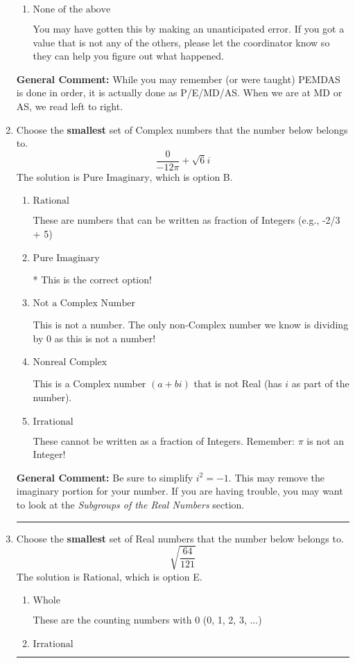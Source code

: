 \documentclass{extbook}[14pt]
\newcommand{\litem}[1]{\item #1

\rule{\textwidth}{0.4pt}}
\begin{document}
\begin{enumerate}
{\begin{enumerate}[label=\Alph*.]
 215.727, which corresponds to an Order of Operations error: multiplying by negative before squaring. For example: $(-3)^2 \neq -3^2$
\item \( \text{None of the above} \)

 You may have gotten this by making an unanticipated error. If you got a value that is not any of the others, please let the coordinator know so they can help you figure out what happened.
\end{enumerate}

\textbf{General Comment:} While you may remember (or were taught) PEMDAS is done in order, it is actually done as P/E/MD/AS. When we are at MD or AS, we read left to right.
}
\litem{
Choose the \textbf{smallest} set of Complex numbers that the number below belongs to.
\[ \frac{0}{-12 \pi}+\sqrt{6}i \]The solution is \( \text{Pure Imaginary} \), which is option B.\begin{enumerate}[label=\Alph*.]
\item \( \text{Rational} \)

These are numbers that can be written as fraction of Integers (e.g., -2/3 + 5)
\item \( \text{Pure Imaginary} \)

* This is the correct option!
\item \( \text{Not a Complex Number} \)

This is not a number. The only non-Complex number we know is dividing by 0 as this is not a number!
\item \( \text{Nonreal Complex} \)

This is a Complex number $(a+bi)$ that is not Real (has $i$ as part of the number).
\item \( \text{Irrational} \)

These cannot be written as a fraction of Integers. Remember: $\pi$ is not an Integer!
\end{enumerate}

\textbf{General Comment:} Be sure to simplify $i^2 = -1$. This may remove the imaginary portion for your number. If you are having trouble, you may want to look at the \textit{Subgroups of the Real Numbers} section.
}
\litem{
Choose the \textbf{smallest} set of Real numbers that the number below belongs to.
\[ \sqrt{\frac{64}{121}} \]The solution is \( \text{Rational} \), which is option E.\begin{enumerate}[label=\Alph*.]
\item \( \text{Whole} \)

These are the counting numbers with 0 (0, 1, 2, 3, ...)
\item \( \text{Irrational} \)


\end{enumerate}}
\end{enumerate}
\end{document}
